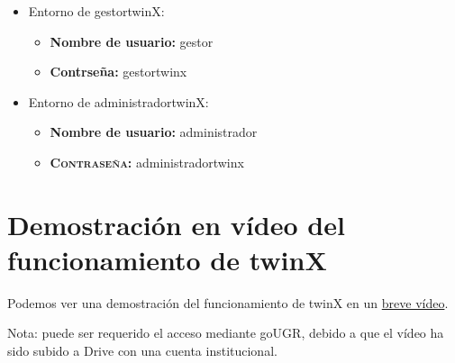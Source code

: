 \begin{itemize}
	\item Entorno de \gls{gestortwinX}:
	\begin{itemize}
		\item \textbf{Nombre de usuario:} gestor
		\item \textbf{Contrseña:} gestortwinx	
	\end{itemize}
	\item Entorno de \gls{administradortwinX}:
	\begin{itemize}
		\item \textbf{Nombre de usuario:} administrador
		\item \textbf{\textsc{Contraseña}:} administradortwinx
	\end{itemize}
\end{itemize}

\section{Demostración en vídeo del funcionamiento de twinX}

Podemos ver una demostración del funcionamiento de twinX en un  \href{https://drive.google.com/file/d/1qD5JqtxIYvh9DXkvvUacubeIoRSsUQ11/view?usp=sharing}{breve vídeo}.

Nota: puede ser requerido el acceso mediante goUGR, debido a que el vídeo ha sido subido a Drive con una cuenta institucional.


